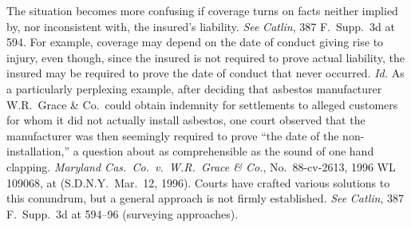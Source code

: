 \documentclass[
  12pt,
  letterpaper,
]{scrartcl}
\begin{document}
The situation becomes more confusing if coverage turns on facts neither implied
by, nor inconsistent with, the insured's liability.
\textit{See} \textit{Catlin}, 387 F.~Supp.~3d at 594. For example, coverage may
depend on the date of conduct giving rise to injury, even though, since the
insured is not required to prove actual liability, the insured may be required
to prove the date of conduct that never occurred. \textit{Id.} As a
particularly perplexing example, after deciding that asbestos manufacturer
W.R.~Grace \& Co.~could obtain indemnity for settlements to alleged customers
for whom it did not actually install asbestos, one court observed that the
manufacturer was then seemingly required to prove ``the date of the
non-installation,'' a question about as comprehensible as the sound of one hand
clapping. \textit{Maryland Cas.~Co.~v.~W.R.~Grace \& Co.}, No.~88-cv-2613, 1996
WL 109068, at  (S.D.N.Y.~Mar.~12, 1996). Courts have crafted various
solutions to this conundrum, but a general approach is not firmly established.
\textit{See} \textit{Catlin}, 387 F.~Supp.~3d at 594--96 (surveying
approaches).
\end{document}
